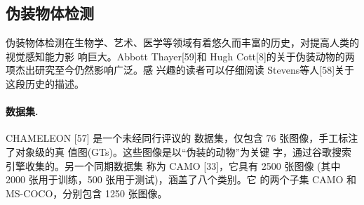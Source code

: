 \documentclass[final]{cvpr}
\newcommand{\mypara}[1]{\paragraph{#1.}}
\begin{document}
\begin{table}
    \caption{从 COD 数据集对比信息来看，COD10K 数据集提 供了更丰富的注释标签。数量(Img.):图片数。类(Cls.): 类别。Att.:属性。BBox.;包围盒。Ml.:抠图 [74] 级标注
(图. 7)。Ins.:实例级标签。Cate.:类别标签。Spi.:显式拆 分训练集与测试集。Obj.:物体。}\label{tab:COD_Dataset}
\end{table}



\subsection{伪装物体检测}
伪装物体检测在生物学、艺术、医学等领域有着悠久而丰富的历史，对提高人类的视觉感知能力影 响巨大。Abbott Thayer[59]和 Hugh Cott[8]的关于伪装动物的两项杰出研究至今仍然影响广泛。感 兴趣的读者可以仔细阅读 Stevens等人[58]关于这段历史的描述。\mypara{数据集}CHAMELEON [57] 是一个未经同行评议的 数据集，仅包含 76 张图像，手工标注了对象级的真 值图(GTs)。这些图像是以“伪装的动物”为关键 字，通过谷歌搜索引擎收集的。另一个同期数据集 称为 CAMO [33]，它具有 2500 张图像 (其中 2000 张用于训练，500 张用于测试)，涵盖了八个类别。它 的两个子集 CAMO 和 MS-COCO，分别包含 1250 张图像。
\end{document}
